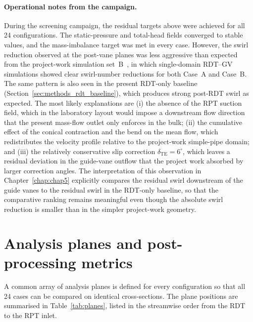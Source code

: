 \paragraph{Operational notes from the campaign.}
During the screening campaign, the residual targets above were achieved for all 24 configurations. The static-pressure and total-head fields converged to stable values, and the mass-imbalance target was met in every case. However, the swirl reduction observed at the post-vane planes was less aggressive than expected from the project-work simulation set~B~\cite{Leonsen2025}, in which single-domain RDT--GV simulations showed clear swirl-number reductions for both Case~A and Case~B. The same pattern is also seen in the present RDT-only baseline (Section~\ref{sec:methods_rdt_baseline}), which produces strong post-RDT swirl as expected. The most likely explanations are (i) the absence of the RPT suction field, which in the laboratory layout would impose a downstream flow direction that the present mass-flow outlet only enforces in the bulk; (ii) the cumulative effect of the conical contraction and the bend on the mean flow, which redistributes the velocity profile relative to the project-work simple-pipe domain; and (iii) the relatively conservative slip correction $\delta_{\mathrm{TE}} = 6^\circ$, which leaves a residual deviation in the guide-vane outflow that the project work absorbed by larger correction angles. The interpretation of this observation in Chapter~\ref{chap:chap5} explicitly compares the residual swirl downstream of the guide vanes to the residual swirl in the RDT-only baseline, so that the comparative ranking remains meaningful even though the absolute swirl reduction is smaller than in the simpler project-work geometry.
 
\section{Analysis planes and post-processing metrics}
\label{sec:methods_planes_metrics}
 
A common array of analysis planes is defined for every configuration so that all 24 cases can be compared on identical cross-sections. The plane positions are summarised in Table~\ref{tab:planes}, listed in the streamwise order from the RDT to the RPT inlet.
 
